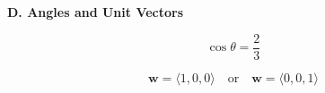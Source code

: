 \documentclass[10pt]{article}
\newcommand{\answerbar}[1]{%
  \vspace{0.55em}%
  \noindent\colorbox{sectiongray}{%
    \parbox{\dimexpr\textwidth-2\fboxsep\relax}{%
      \strut\textbf{#1}\strut
    }%
  }%
  \par\vspace{0.50em}%
}
\begin{document}
\vspace{0.25em}


\answerbar{D. Angles and Unit Vectors}

\begin{parts}

\item
\[
\boxed{\cos\theta=\frac23}
\]

\item
\[
\boxed{\mathbf w=\langle1,0,0\rangle
\quad\text{or}\quad
\mathbf w=\langle0,0,1\rangle}
\]

\end{parts}
\end{document}
